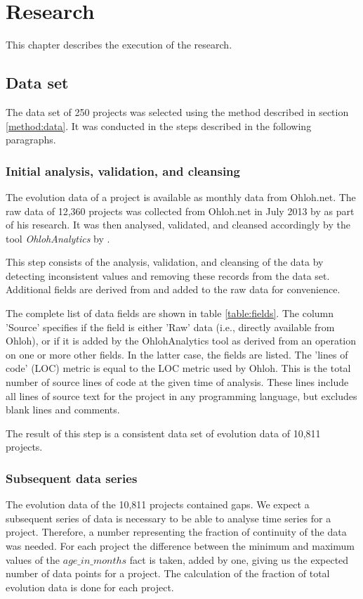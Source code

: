 \chapter{Research}
\label{research}

This chapter describes the execution of the research.

\section{Data set}
The data set of 250 projects was selected using the method described in section
\ref{method:data}. It was conducted in the steps described in the following
paragraphs.

\subsection{Initial analysis, validation, and cleansing}
The evolution data of a project is available as monthly data from Ohloh.net. The
raw data of 12,360 projects was collected from Ohloh.net in July 2013 by
\citet{bruntink2014} as part of his research. It was then analysed, validated,
and cleansed accordingly by the tool \emph{OhlohAnalytics }\rm
by \citet{ohlohanalytics}.

This step consists of the analysis, validation, and cleansing of the data by
detecting inconsistent values and removing these records from the data set.
Additional fields are derived from and added to the raw data for convenience.

The complete list of data fields are shown in table \ref{table:fields}. The
column 'Source' specifies if the field is either 'Raw' data (i.e., directly
available from Ohloh), or if it is added by the OhlohAnalytics tool as derived
from an operation on one or more other fields. In the latter case, the fields
are listed. The 'lines of code' (LOC) metric is equal to the LOC metric used by
Ohloh. This is the total number of source lines of code at the given time of
analysis. These lines include all lines of source text for the project in any
programming language, but excludes blank lines and comments.

The result of this step is a consistent data set of evolution data of 10,811
projects.



\subsection{Subsequent data series}
The evolution data of the 10,811 projects contained gaps. We expect a
subsequent series of data is necessary to be able to analyse time series for a
project. Therefore, a number representing the fraction of continuity of the
data was needed. For each project the difference between the minimum and
maximum values of the $age\_in\_months$ fact is taken, added by one, giving us
the expected number of data points for a project. The calculation of the
fraction of total evolution data is done for each project.

